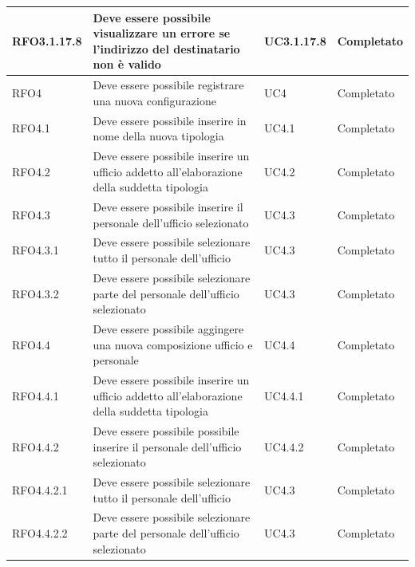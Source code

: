\begin{longtable}{| p{3cm} | p{6cm} | p{3cm} | p{3cm} |}
        RFO3.1.17.8 & Deve essere possibile visualizzare un errore se l'indirizzo del destinatario non è valido & UC3.1.17.8 & Completato
        \\ \hline
        
        RFO4 & Deve essere possibile registrare una nuova configurazione & UC4 & Completato
        \\ \hline
        
        RFO4.1 & Deve essere possibile inserire in nome della nuova tipologia & UC4.1 & Completato
        \\ \hline
        
        RFO4.2 & Deve essere possibile inserire un ufficio addetto all'elaborazione della suddetta tipologia & UC4.2 & Completato
        \\ \hline
        
        RFO4.3 & Deve essere possibile inserire il personale dell'ufficio selezionato & UC4.3 & Completato
        \\ \hline
        
        RFO4.3.1 & Deve essere possibile selezionare tutto il personale dell'ufficio & UC4.3 & Completato
        \\ \hline
        
        RFO4.3.2 & Deve essere possibile selezionare parte del personale dell'ufficio selezionato & UC4.3 & Completato
        \\ \hline
        
        RFO4.4 & Deve essere possibile aggingere una nuova composizione ufficio e personale & UC4.4 & Completato
        \\ \hline
        
        RFO4.4.1 & Deve essere possibile inserire un ufficio addetto all'elaborazione della suddetta tipologia & UC4.4.1 & Completato
        \\ \hline
        
        RFO4.4.2 & Deve essere possibile possibile inserire il personale dell'ufficio selezionato & UC4.4.2 & Completato
        \\ \hline
        
        RFO4.4.2.1 & Deve essere possibile selezionare tutto il personale dell'ufficio & UC4.3 & Completato
        \\ \hline
        
        RFO4.4.2.2 & Deve essere possibile selezionare parte del personale dell'ufficio selezionato & UC4.3 & Completato
        \\ \hline
        

\end{longtable}
